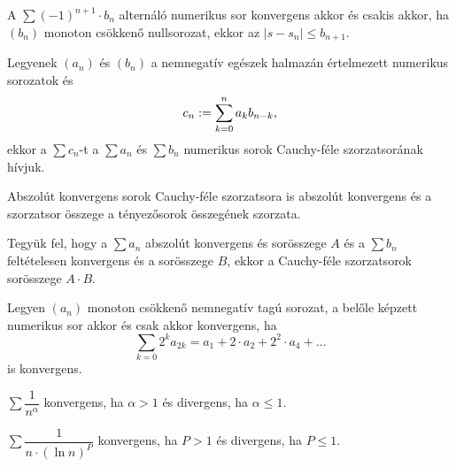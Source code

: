\begin{theorem}
  A $\sum  (-1)^{n+1} \cdot b_n$ alternáló numerikus sor konvergens akkor és
  csakis akkor, ha $(b_n)$ monoton csökkenő nullsorozat, ekkor az $|s - s_n|
    \leq b_{n + 1}$.
\end{theorem}

\begin{definition}
  Legyenek $(a_n)$ és $(b_n)$ a nemnegatív egészek halmazán értelmezett
  numerikus sorozatok és
  \vspace{-.75em}
  \[
    c_n:=\sum_{k=0}^n a_k b_{n-k}
    \text,
  \]
  ekkor a $\sum c_n$-t a $\sum a_n$ és $\sum b_n$ numerikus sorok Cauchy-féle
  szorzatsorának hívjuk.
\end{definition}

\begin{theorem}
  Abszolút konvergens sorok Cauchy-féle szorzatsora is abszolút konvergens és
  a szorzatsor összege a tényezősorok összegének szorzata.
\end{theorem}

\begin{theorem}
  Tegyük fel, hogy a $\sum a_n$ abszolút konvergens és sorösszege $A$ és a
  $\sum b_n$ feltételesen konvergens és a sorösszege $B$, ekkor a Cauchy-féle
  szorzatsorok sorösszege $A\cdot B$.
\end{theorem}





\begin{theorem}
  Legyen $(a_n)$ monoton csökkenő nemnegatív tagú sorozat, a belőle képzett
  numerikus sor akkor és csak akkor konvergens, ha
  \[
    \sum_{k = 0} 2^k a_{2k} =
    a_1 + 2 \cdot a_2 + 2^2 \cdot a_4 + \dots
  \]
  is konvergens.
\end{theorem}

\begin{statement}
  $\displaystyle \sum \dfrac{1}{n^\alpha}$ konvergens, ha $\alpha > 1$ és
  divergens, ha $\alpha \leq 1$.
\end{statement}

\begin{statement}
  $\displaystyle \sum \dfrac{1}{n \cdot (\ln n)^P}$ konvergens, ha $P>1$ és
  divergens, ha $P \leq 1$.
\end{statement}
